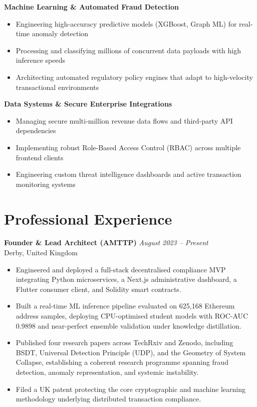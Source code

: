 \documentclass[11pt,a4paper]{article}
\begin{document}
\textbf{Machine Learning \& Automated Fraud Detection}
\begin{itemize}
  \item Engineering high-accuracy predictive models (XGBoost, Graph ML) for real-time anomaly detection
  \item Processing and classifying millions of concurrent data payloads with high inference speeds
  \item Architecting automated regulatory policy engines that adapt to high-velocity transactional environments
\end{itemize}

\textbf{Data Systems \& Secure Enterprise Integrations}
\begin{itemize}
  \item Managing secure multi-million revenue data flows and third-party API dependencies
  \item Implementing robust Role-Based Access Control (RBAC) across multiple frontend clients
  \item Engineering custom threat intelligence dashboards and active transaction monitoring systems
\end{itemize}

\section*{Professional Experience}

\textbf{Founder \& Lead Architect (AMTTP)} \hfill \textit{August 2023 -- Present}\\
Derby, United Kingdom

\begin{itemize}
  \item Engineered and deployed a full-stack decentralised compliance MVP integrating Python microservices, a Next.js administrative dashboard, a Flutter consumer client, and Solidity smart contracts.
  \item Built a real-time ML inference pipeline evaluated on 625,168 Ethereum address samples, deploying CPU-optimised student models with ROC-AUC 0.9898 and near-perfect ensemble validation under knowledge distillation.
  \item Published four research papers across TechRxiv and Zenodo, including BSDT, Universal Detection Principle (UDP), and the Geometry of System Collapse, establishing a coherent research programme spanning fraud detection, anomaly representation, and systemic instability.
  \item Filed a UK patent protecting the core cryptographic and machine learning methodology underlying distributed transaction compliance.
\end{itemize}
\end{document}
